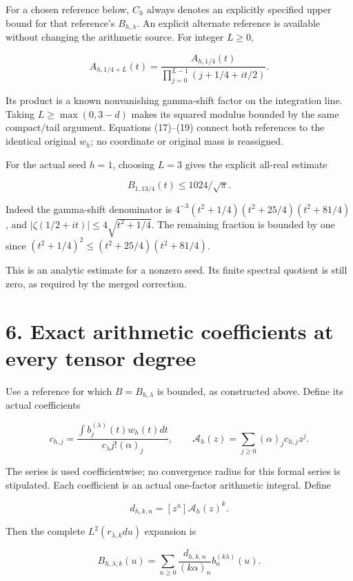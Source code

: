 \documentclass[
  11pt,
]{article}
\begin{document}
For a chosen reference below, \(C_h\) always denotes an explicitly
specified upper bound for that reference's \(B_{h,\lambda}\). An
explicit alternate reference is available without changing the
arithmetic source. For integer \(L\ge0\),

\[
A_{h,1/4+L}(t)
=\frac{A_{h,1/4}(t)}{\prod_{j=0}^{L-1}(j+1/4+it/2)}.                \tag{22}
\]

Its product is a known nonvanishing gamma-shift factor on the
integration line. Taking \(L\ge\max(0,3-d)\) makes its squared modulus
bounded by the same compact/tail argument. Equations (17)--(19) connect
both references to the identical original \(w_h\); no coordinate or
original mass is reassigned.

For the actual seed \(h=1\), choosing \(L=3\) gives the explicit
all-real estimate

\[
\boxed{
B_{1,13/4}(t)\le1024/\sqrt\pi.
}                                                                   \tag{23}
\]

Indeed the gamma-shift denominator is
\(4^{-3}(t^2+1/4)(t^2+25/4)(t^2+81/4)\), and
\(|\zeta(1/2+it)|\le4\sqrt{t^2+1/4}\). The remaining fraction is bounded
by one since \((t^2+1/4)^2\le(t^2+25/4)(t^2+81/4)\).

This is an analytic estimate for a nonzero seed. Its finite spectral
quotient is still zero, as required by the merged correction.

\section{6. Exact arithmetic coefficients at every tensor
degree}\label{exact-arithmetic-coefficients-at-every-tensor-degree}

Use a reference for which \(B=B_{h,\lambda}\) is bounded, as constructed
above. Define its actual coefficients

\[
c_{h,j}=\frac{\int b_j^{(\lambda)}(t)w_h(t)dt}
                 {c_\lambda j!(\alpha)_j},\qquad
\mathcal A_h(z)=\sum_{j\ge0}(\alpha)_j c_{h,j}z^j.                  \tag{24}
\]

The series is used coefficientwise; no convergence radius for this
formal series is stipulated. Each coefficient is an actual one-factor
arithmetic integral. Define

\[
d_{h,k,n}=[z^n]\mathcal A_h(z)^k.
\]

Then the complete \(L^2(r_{\lambda,k}du)\) expansion is

\[
\boxed{
B_{h,\lambda;k}(u)
=\sum_{n\ge0}\frac{d_{h,k,n}}{(k\alpha)_n}
                                     b_n^{(k\lambda)}(u).
}                                                                   \tag{25}
\]
\end{document}
